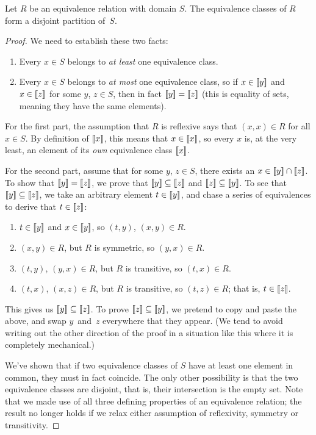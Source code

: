\documentclass[../generics]{subfiles}
\begin{document}
\begin{proposition}
Let $R$ be an equivalence relation with domain $S$. The equivalence classes of $R$ form a disjoint partition of~$S$.
\end{proposition}
\begin{proof}
We need to establish these two facts:
\begin{enumerate}
\item Every $x\in S$ belongs to \emph{at least} one equivalence class.
\item Every $x\in S$ belongs to \emph{at most} one equivalence class, so if $x\in[\![y]\!]$ and $x\in[\![z]\!]$ for some $y$, $z\in S$, then in fact $[\![y]\!]=[\![z]\!]$ (this is equality of sets, meaning they have the same elements).
\end{enumerate}

For the first part, the assumption that $R$ is reflexive says that $(x,x)\in R$ for all $x\in S$. By definition of $[\![x]\!]$, this means that $x\in[\![x]\!]$, so every $x$ is, at the very least, an element of its \emph{own} equivalence class $[\![x]\!]$.

For the second part, assume that for some $y$, $z\in S$, there exists an $x\in[\![y]\!]\cap[\![z]\!]$. To show that $[\![y]\!]=[\![z]\!]$, we prove that $[\![y]\!]\subseteq[\![z]\!]$ and $[\![z]\!]\subseteq[\![y]\!]$. To see that $[\![y]\!]\subseteq[\![z]\!]$, we take an arbitrary element $t\in[\![y]\!]$, and chase a series of equivalences to derive that $t\in[\![z]\!]$:
\begin{enumerate}
\item $t\in[\![y]\!]$ and $x\in[\![y]\!]$, so $(t,y)$, $(x,y)\in R$.
\item $(x,y)\in R$, but $R$ is symmetric, so $(y,x)\in R$.
\item $(t,y)$, $(y,x)\in R$, but $R$ is transitive, so $(t,x)\in R$.
\item $(t,x)$, $(x,z)\in R$, but $R$ is transitive, so $(t,z)\in R$; that is, $t\in[\![z]\!]$.
\end{enumerate}
This gives us $[\![y]\!]\subseteq[\![z]\!]$. To prove $[\![z]\!]\subseteq[\![y]\!]$, we pretend to copy and paste the above, and swap $y$~and~$z$ everywhere that they appear. (We tend to avoid writing out the other direction of the proof in a situation like this where it is completely mechanical.)

We've shown that if two equivalence classes of $S$ have at least one element in common, they must in fact coincide. The only other possibility is that the two equivalence classes are disjoint, that is, their intersection is the empty set. Note that we made use of all three defining properties of an equivalence relation; the result no longer holds if we relax either assumption of reflexivity, symmetry or transitivity.
\end{proof}
\end{document}
